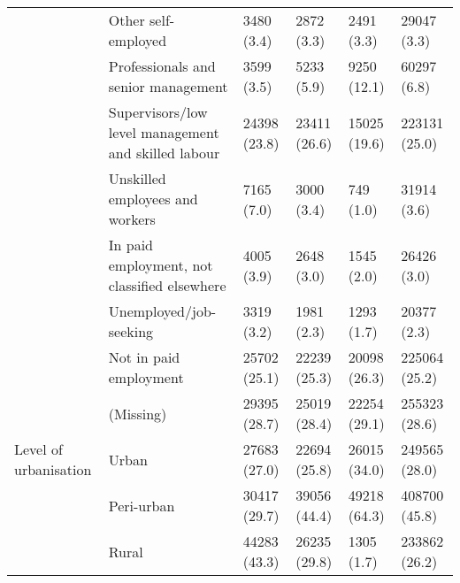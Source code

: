 \begin{tabular}{llllll}
 & Other self-employed & 3480 (3.4) & 2872 (3.3) & 2491 (3.3) & 29047 (3.3)\\
 & Professionals and senior management & 3599 (3.5) & 5233 (5.9) & 9250 (12.1) & 60297 (6.8)\\
 & Supervisors/low level management and skilled labour & 24398 (23.8) & 23411 (26.6) & 15025 (19.6) & 223131 (25.0)\\
 & Unskilled employees and workers & 7165 (7.0) & 3000 (3.4) & 749 (1.0) & 31914 (3.6)\\
 & In paid employment, not classified elsewhere & 4005 (3.9) & 2648 (3.0) & 1545 (2.0) & 26426 (3.0)\\
 & Unemployed/job-seeking & 3319 (3.2) & 1981 (2.3) & 1293 (1.7) & 20377 (2.3)\\
 & Not in paid employment & 25702 (25.1) & 22239 (25.3) & 20098 (26.3) & 225064 (25.2)\\
 & (Missing) & 29395 (28.7) & 25019 (28.4) & 22254 (29.1) & 255323 (28.6)\\
\addlinespace
Level of urbanisation & Urban & 27683 (27.0) & 22694 (25.8) & 26015 (34.0) & 249565 (28.0)\\
 & Peri-urban & 30417 (29.7) & 39056 (44.4) & 49218 (64.3) & 408700 (45.8)\\
 & Rural & 44283 (43.3) & 26235 (29.8) & 1305 (1.7) & 233862 (26.2)\\
\bottomrule
\end{tabular}